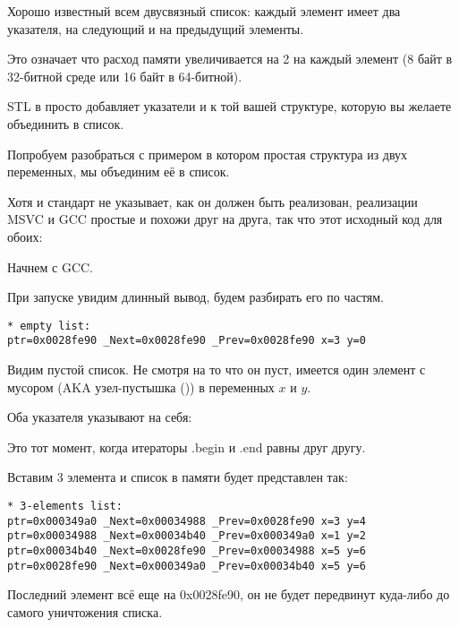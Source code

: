 \label{std_list}

Хорошо известный всем двусвязный список: каждый элемент имеет два указателя, на следующий и на предыдущий
элементы.

Это означает что расход памяти увеличивается на 2  на каждый элемент (8 байт в 32-битной среде или
16 байт в 64-битной).

STL в \Cpp просто добавляет указатели  и  к той вашей структуре, которую вы желаете объединить в список.

Попробуем разобраться с примером в котором простая структура из двух переменных, мы объединим её в список.

Хотя и стандарт \Cpp не указывает, как он должен быть реализован, реализации
MSVC и GCC простые и похожи друг на друга, так что этот исходный код для обоих:




Начнем с GCC.

При запуске увидим длинный вывод, будем разбирать его по частям.

\begin{lstlisting}
* empty list:
ptr=0x0028fe90 _Next=0x0028fe90 _Prev=0x0028fe90 x=3 y=0
\end{lstlisting}

Видим пустой список.
Не смотря на то что он пуст, имеется один элемент с мусором (\ac{AKA} узел-пустышка ()) 
в переменных $x$ и $y$.

Оба указателя  \AndENRU {} указывают на себя:



Это тот момент, когда итераторы .begin и .end равны друг другу.

Вставим 3 элемента и список в памяти будет представлен так:

\begin{lstlisting}
* 3-elements list:
ptr=0x000349a0 _Next=0x00034988 _Prev=0x0028fe90 x=3 y=4
ptr=0x00034988 _Next=0x00034b40 _Prev=0x000349a0 x=1 y=2
ptr=0x00034b40 _Next=0x0028fe90 _Prev=0x00034988 x=5 y=6
ptr=0x0028fe90 _Next=0x000349a0 _Prev=0x00034b40 x=5 y=6
\end{lstlisting}

Последний элемент всё еще на 0x0028fe90, 
он не будет передвинут куда-либо до самого уничтожения списка.

